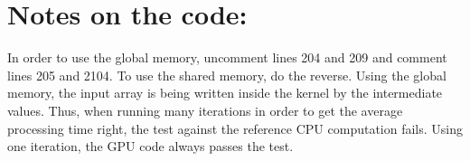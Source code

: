\documentclass[12pt] {article}
\begin{document}
\section*{Notes on the code:}
In order to use the global memory, uncomment lines 204 and 209 and comment lines 205 and 2104. To use the shared memory, do the reverse. Using the global memory, the input array is being written inside the kernel by the intermediate values. Thus, when running many iterations in order to get the average processing time right, the test against the reference CPU computation fails. Using one iteration, the GPU code always passes the test. 
\end{document}
